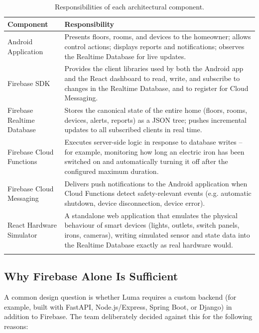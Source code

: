 \documentclass[11pt,a4paper]{article}
\begin{document}
\begin{longtable}{@{}p{3.2cm}p{10.8cm}@{}}
\toprule
\textbf{Component} & \textbf{Responsibility} \\
\midrule
\endhead
Android Application & Presents floors, rooms, and devices to the homeowner; allows control actions; displays reports and notifications; observes the Realtime Database for live updates. \\
Firebase SDK & Provides the client libraries used by both the Android app and the React dashboard to read, write, and subscribe to changes in the Realtime Database, and to register for Cloud Messaging. \\
Firebase Realtime Database & Stores the canonical state of the entire home (floors, rooms, devices, alerts, reports) as a JSON tree; pushes incremental updates to all subscribed clients in real time. \\
Firebase Cloud Functions & Executes server-side logic in response to database writes -- for example, monitoring how long an electric iron has been switched on and automatically turning it off after the configured maximum duration. \\
Firebase Cloud Messaging & Delivers push notifications to the Android application when Cloud Functions detect safety-relevant events (e.g. automatic shutdown, device disconnection, device error). \\
React Hardware Simulator & A standalone web application that emulates the physical behaviour of smart devices (lights, outlets, switch panels, irons, cameras), writing simulated sensor and state data into the Realtime Database exactly as real hardware would. \\
\bottomrule
\caption{Responsibilities of each architectural component.}
\label{tab:component-responsibilities}
\end{longtable}

\subsection{Why Firebase Alone Is Sufficient}
A common design question is whether Luma requires a custom backend (for example, built with FastAPI, Node.js/Express, Spring Boot, or Django) in addition to Firebase. The team deliberately decided against this for the following reasons:
\end{document}
